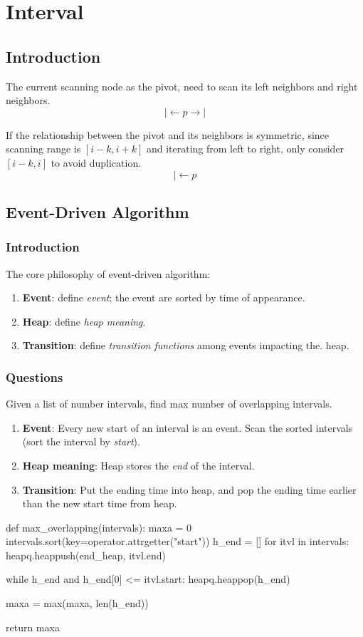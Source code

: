\chapter{Interval}


\section{Introduction}
 The current scanning node as the pivot, need to scan its left neighbors and right neighbors. 
$$
|\leftarrow p \rightarrow |
$$

If the relationship between the pivot and its neighbors is symmetric, since scanning range is $[i-k, i+k]$ and iterating from left to right, only consider $[i-k, i]$ to avoid duplication.
$$
|\leftarrow p
$$

\section{Event-Driven Algorithm}
\subsection{Introduction}
The core philosophy of event-driven algorithm:
\begin{enumerate}
\item \textbf{Event}: define \textit{event}; the event are sorted by time of appearance.
\item \textbf{Heap}: define \textit{heap meaning}.
\item \textbf{Transition}: define \textit{transition functions} among events impacting the.
heap. 
\end{enumerate} 

\subsection{Questions}
 Given a list of number intervals, find max number of overlapping
intervals. 
\begin{enumerate}
\item \textbf{Event}: Every new start of an interval is an event. Scan the sorted intervals (sort the interval by \textit{start}).
\item \textbf{Heap meaning}: Heap stores the \textit{end} of the interval. 
\item \textbf{Transition}: Put the ending time into heap, and pop the ending time earlier than the new start time from heap.
\end{enumerate}

\begin{python}
def max_overlapping(intervals):
    maxa = 0
    intervals.sort(key=operator.attrgetter("start"))
    h_end = []
    for itvl in intervals:
        heapq.heappush(end_heap, itvl.end)
        
        while h_end and h_end[0] <= itvl.start:
            heapq.heappop(h_end)

        maxa = max(maxa, len(h_end))

    return maxa
\end{python}

